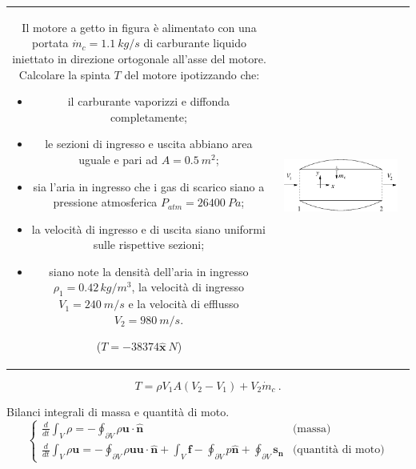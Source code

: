 \noindent
\begin{tabular}{cc}
\begin{minipage}{0.60\textwidth}
\begin{exerciseS}
    Il motore a getto in figura è alimentato con una portata $\dot{m}_c = 
1.1\ kg/s$ di carburante liquido iniettato in direzione 
ortogonale all'asse del motore. Calcolare la spinta $T$ del 
motore ipotizzando che:
\begin{itemize}
\item il carburante vaporizzi e diffonda completamente;
\item le sezioni di ingresso e uscita abbiano area uguale e pari 
      ad $A = 0.5\ m^2$;
\item sia l'aria in ingresso che i gas di scarico siano a pressione 
    atmosferica $P_{atm}=26400\ Pa$;
\item la velocità di ingresso e di uscita siano uniformi sulle 
      rispettive sezioni;
\item siano note la densità dell'aria in ingresso $\rho_1 = 0.42\, 
      kg/m^3$, la velocità di ingresso $V_1 = 240\ m/s$ 
      e la velocità di efflusso $V_2 = 980\ m/s$.
\end{itemize}
($T = -38374\hat{\bm{x}}\ N$)
\end{exerciseS}
\end{minipage}
&
\begin{minipage}{0.35\textwidth}
   \begin{center}
   \includegraphics[width=0.90\textwidth]{./fig/motore_a_getto.eps}
   \end{center}
\end{minipage}
\end{tabular}

\sol
\begin{equation}
    T = \rho V_1 A (V_2-V_1) + V_2 \dot{m}_c \ .
\end{equation}

\partone
 Bilanci integrali di massa e quantità di moto.
\begin{equation}
\begin{cases}
  \frac{d}{dt} \int_V \rho = -\oint_{\partial V} \rho \bm{u} \cdot \hat{\bm{n}}  & \text{(massa)} \\
  \frac{d}{dt} \int_V \rho \bm{u} = -\oint_{\partial V} \rho \bm{u} \bm{u} \cdot \hat{\bm{n}}
  +\int_V \bm{f} - \oint_{\partial V} p \hat{\bm{n}} + \oint_{\partial V} \bm{s_n} & \text{(quantità di moto)}
\end{cases}
\end{equation}

